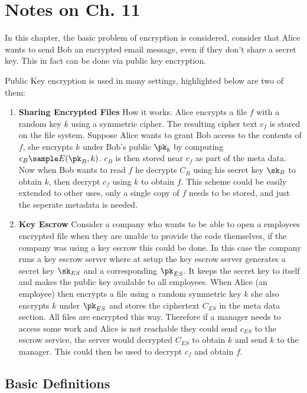 \chapter{Notes on Ch. 11}

In this chapter, the basic problem of encryption is considered, consider that Alice wants to send Bob an 
encrypted email message, even if they don't share a secret key. This in fact can be done via public key encryption. 

Public Key encryption is used in many settings, highlighted below are two of them: 

\begin{enumerate}
    \item \textbf{Sharing Encrypted Files}
    How it works: Alice encrypts a file \(f\) with a random key \(k\) using a symmetric cipher. The resulting cipher text \(c_f\) is stored on the file system. Suppose Alice wants to grant Bob access to the contents of \(f\), she encrypts \(k\) under Bob's public \(\pk_b\)  by computing \(c_B \sample E(\pk_B, k)\). \(c_B\) is then stored near \(c_f\) as part of the meta data. Now when Bob wants to read \(f\) he decrypts \(C_B\) using his secret key \(\sk_B\) to obtain \(k\), then decrypt \(c_f\) using \(k\) to obtain \(f\). This scheme could be easily extended to other uses, only a single copy of \(f\) needs to be stored, and just the seperate metadata is needed. 
    \item \textbf{Key Escrow}
    Consider a company who wants to be able to open a employees encrypted file when they are unable to provide the code themselves, if the company was using a key escrow this could be done. In this case the company runs a key escrow server where at setup the key escrow server generates a secret key \(\sk_{ES} \) and a corresponding \(\pk_{ES} \). It keeps the secret key to itself and makes the public key available to all employees. When Alice (an employee) then encrypts a file using a random symmetric key \(k\) she also encrypts \(k\) under \(\pk_{ES}\) and stores the ciphertext \(C_{ES}\) in the meta data section. All files are encrypted this way. Therefore if a manager needs to access some work and Alice is not reachable they could send \(c_{ES}\) to the escrow service, the server would decrypted \(C_{ES}\) to obtain \(k\) and send \(k\) to the manager. This could then be used to decrypt \(c_f\)  and obtain \(f\). 
\end{enumerate}

\section{\textbf{Basic Definitions}}

